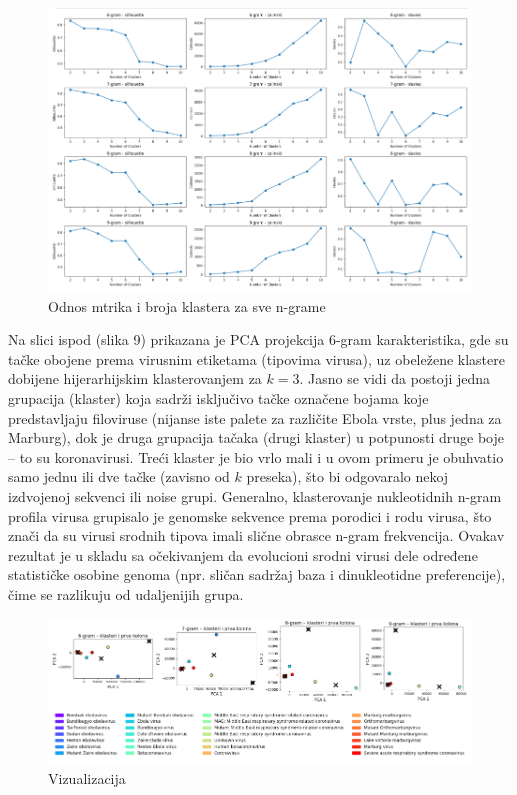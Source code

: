 \documentclass[a4paper,12pt]{article}
\begin{document}
\begin{figure}[h!]
    \centering
    \includegraphics[width=1.2\textwidth]{images/hc_metrika_nuk.png}
    \caption{Odnos mtrika i broja klastera za sve n-grame}
    \label{fig:hc_met_nuk}
\end{figure}

Na slici ispod (slika 9) prikazana je PCA projekcija 6-gram karakteristika, gde su tačke obojene prema virusnim
etiketama (tipovima virusa), uz obeležene klastere dobijene hijerarhijskim klasterovanjem za $k=3$. Jasno se
vidi da postoji jedna grupacija (klaster) koja sadrži isključivo tačke označene bojama koje predstavljaju
filoviruse (nijanse iste palete za različite Ebola vrste, plus jedna za Marburg), dok je druga grupacija tačaka
(drugi klaster) u potpunosti druge boje – to su koronavirusi. Treći klaster je bio vrlo mali i u ovom primeru je
obuhvatio samo jednu ili dve tačke (zavisno od $k$ preseka), što bi odgovaralo nekoj izdvojenoj sekvenci ili
noise grupi. Generalno, klasterovanje nukleotidnih n-gram profila virusa grupisalo je genomske
sekvence prema porodici i rodu virusa, što znači da su virusi srodnih tipova imali slične obrasce n-gram
frekvencija. Ovakav rezultat je u skladu sa očekivanjem da evolucioni srodni virusi dele određene statističke
osobine genoma (npr. sličan sadržaj baza i dinukleotidne preferencije), čime se razlikuju od udaljenijih
grupa.

\begin{figure}[h!]
    \centering
    \includegraphics[width=1.2\textwidth]{images/hc_nuk.png}
    \caption{Vizualizacija}
    \label{fig:hc_nuk}
\end{figure}
\end{document}
